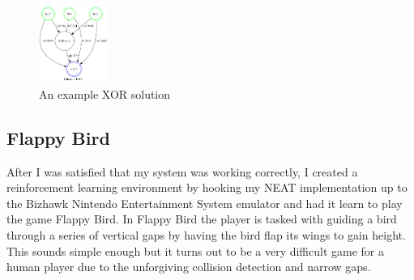 \documentclass[twocolumn,letterpaper]{article}
\begin{document}
\begin{figure}[h!]
	\centering
	\includegraphics[width=0.2\textwidth]{images/xor_end.png}
	\caption{An example XOR solution}
	\label{fig:xor}
\end{figure}

\subsection{Flappy Bird} \label{sec:flappy}
After I was satisfied that my system was working correctly, I created a reinforcement learning environment by hooking my NEAT implementation up to the Bizhawk
Nintendo Entertainment System emulator and had it learn to play the game Flappy Bird. In Flappy Bird the player is tasked with guiding a bird through a series of vertical gaps by having the bird
flap its wings to gain height. This sounds simple enough but it turns out to be a very difficult game for a
human player due to the unforgiving collision detection and narrow gaps.
\end{document}
